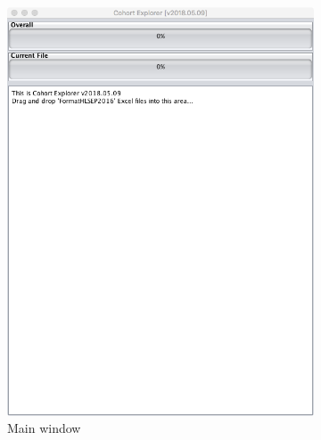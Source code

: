 \documentclass{article}
\begin{document}
\begin{figure}[ht]
    \centering
    \begin{subfigure}[ht]{0.4\linewidth}
        \includegraphics[scale=0.3]{./img/MainWindow-1_1.png}
        \centering
        \caption{Main window}
        \label{fig1a:mainwindow}
    \end{subfigure}
    \vspace{1em}
    \begin{subfigure}[ht]{0.4\linewidth}

\end{subfigure}
\end{figure}
\end{document}
